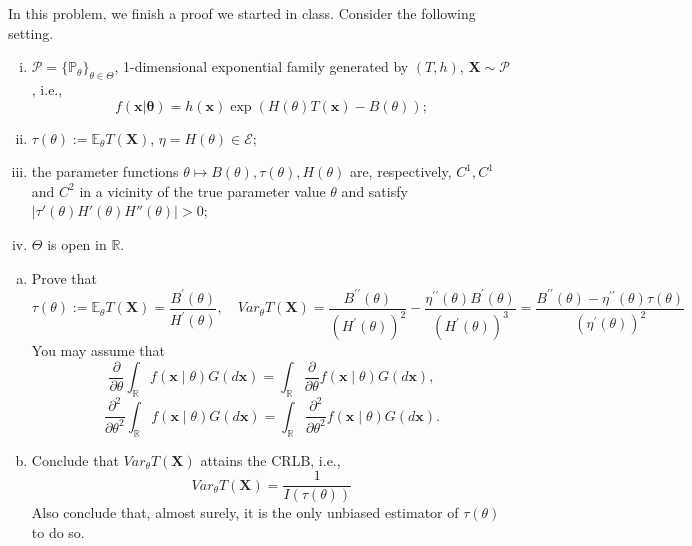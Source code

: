 \begin{ex} \label{ex:5.2}
    In this problem, we finish a proof we started in class. Consider the following setting. 
    \begin{enumerate}[(i)]
        \item $\mathcal{P}=\{\mathbb{P}_\theta\}_{\theta\in\Theta}$, 1-dimensional exponential family generated by $(T,h)$, $\mathbf{X}\sim \mathcal{P}$, i.e., 
        \[
            f(\mathbf{x|\theta})=h(\mathbf{x})\exp\left(H(\theta)T(\mathbf{x})-B(\theta)\right); 
        \]
        \item $\tau(\theta):=\mathbb{E}_\theta T(\mathbf{X})$, $\eta=H(\theta)\in\mathcal{E}$; 
        \item the parameter functions $\theta\mapsto B(\theta), \tau(\theta), H(\theta)$ are, respectively, $C^1, C^1$ and $C^2$ in a
        vicinity of the true parameter value $\theta$ and satisfy $|\tau'(\theta)H'(\theta)H''(\theta)|>0$; 
        \item $\Theta$ is open in $\mathbb{R}$. 
    \end{enumerate}
    \begin{enumerate}[(a)]
        \item Prove that
        \[
        \tau(\theta):=\mathbb{E}_{\theta} T(\mathbf{X})=\frac{B^{\prime}(\theta)}{H^{\prime}(\theta)}, \quad  Var_{\theta} T(\mathbf{X})=\frac{B^{\prime \prime}(\theta)}{\left(H^{\prime}(\theta)\right)^{2}}-\frac{\eta^{\prime \prime}(\theta) B^{\prime}(\theta)}{\left(H^{\prime}(\theta)\right)^{3}}=\frac{B^{\prime \prime}(\theta)-\eta^{\prime \prime}(\theta) \tau(\theta)}{\left(\eta^{\prime}(\theta)\right)^{2}}
        \]
        You may assume that
        \[
            \frac{\partial}{\partial \theta} \int_{\mathbb{R}} f(\mathbf{x} \mid \theta) G(d \mathbf{x})=\int_{\mathbb{R}} \frac{\partial}{\partial \theta} f(\mathbf{x} \mid \theta) G(d \mathbf{x}), 
        \]
        \[
            \frac{\partial^{2}}{\partial \theta^{2}} \int_{\mathbb{R}} f(\mathbf{x} \mid \theta) G(d \mathbf{x})=\int_{\mathbb{R}} \frac{\partial^{2}}{\partial \theta^{2}} f(\mathbf{x} \mid \theta) G(d \mathbf{x}). 
        \]
        \item Conclude that \(Var_{\theta} T(\mathbf{X})\) attains the CRLB, i.e.,
        \[
         Var_{\theta} T(\mathbf{X})=\frac{1}{I(\tau(\theta))}
        \]
        Also conclude that, almost surely, it is the only unbiased estimator of \(\tau(\theta)\) to do so.
    \end{enumerate}
\end{ex}

